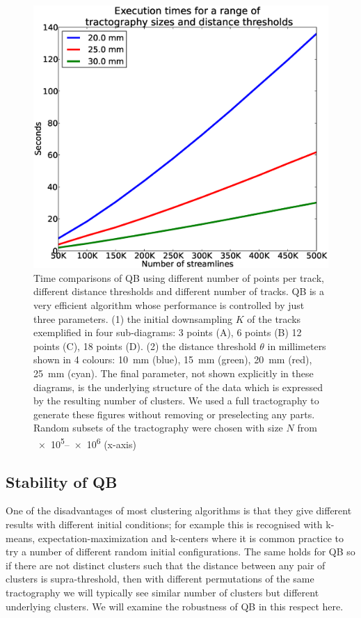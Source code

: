 \documentclass{bioinfo}
\begin{document}
\begin{figure}
\noindent \begin{centering}
\includegraphics[scale=0.23]{Figures/Fig_3_timings}
\par\end{centering}
\caption{Time comparisons of QB using different number of points per
  track, different distance thresholds and different number of
  tracks. QB is a very efficient algorithm whose performance is
  controlled by just three parameters. (1) the initial downsampling $K$
  of the tracks exemplified in four sub-diagrams: 3 points (A), 6 points
  (B) 12 points (C), 18 points (D). (2) the distance threshold $\theta$
  in millimeters shown in 4 colours: 10~mm (blue), 15~mm (green), 20~mm
  (red), 25~mm (cyan). The final parameter, not shown explicitly in
  these diagrams, is the underlying structure of the data which is
  expressed by the resulting number of clusters.  We used a full
  tractography to generate these figures without removing or
  preselecting any parts. Random subsets of the tractography were
  chosen with size $N$ from \numrange{e5}{e6} (x-axis)\label{Flo:Speed1}}
\end{figure}

\subsection{Stability of QB\label{sub:Comparisons}}

One of the disadvantages of most clustering algorithms is that they give
different results with different initial conditions; for example this is
recognised with k-means, expectation-maximization
\citep{dempster1977maximum} and k-centers \citep{gonzalez1985clustering}
where it is common practice to try a number of different random initial
configurations. The same holds for QB so if there are not distinct
clusters such that the distance between any pair of clusters is
supra-threshold, then with different permutations of the same
tractography we will typically see similar number of clusters but
different underlying clusters. We will examine the robustness of QB in
this respect here.
\end{document}
